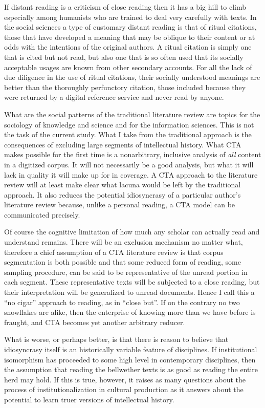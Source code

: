 \documentclass[]{book}
\theoremstyle{definition}
\theoremstyle{definition}
\theoremstyle{definition}
\theoremstyle{remark}
\begin{document}
If distant reading is a criticism of close reading then it has a big
hill to climb especially among humanists who are trained to deal very
carefully with texts. In the social sciences a type of customary distant
reading is that of ritual citations, those that have developed a meaning
that may be oblique to their content or at odds with the intentions of
the original authors. A ritual citation is simply one that is cited but
not read, but also one that is so often used that its socially
acceptable usages are known from other secondary accounts. For all the
lack of due diligence in the use of ritual citations, their socially
understood meanings are better than the thoroughly perfunctory citation,
those included because they were returned by a digital reference service
and never read by anyone.

What are the social patterns of the traditional literature review are
topics for the sociology of knowledge and science and for the
information sciences. This is not the task of the current study. What I
take from the traditional approach is the consequences of excluding
large segments of intellectual history. What CTA makes possible for the
first time is a nonarbitrary, inclusive analysis of \emph{all} content
in a digitized corpus. It will not necessarily be a good analysis, but
what it will lack in quality it will make up for in coverage. A CTA
approach to the literature review will at least make clear what lacuna
would be left by the traditional approach. It also reduces the potential
idiosyncrasy of a particular author's literature review because, unlike
a personal reading, a CTA model can be communicated precisely.

Of course the cognitive limitation of how much any scholar can actually
read and understand remains. There will be an exclusion mechanism no
matter what, therefore a chief assumption of a CTA literature review is
that corpus segmentation is both possible and that some reduced form of
reading, some sampling procedure, can be said to be representative of
the unread portion in each segment. These representative texts will be
subjected to a close reading, but their interpretation will be
generalized to unread documents. Hence I call this a ``no cigar''
approach to reading, as in ``close but''. If on the contrary no two
snowflakes are alike, then the enterprise of knowing more than we have
before is fraught, and CTA becomes yet another arbitrary reducer.

What is worse, or perhaps better, is that there is reason to believe
that idiosyncrasy itself is an historically variable feature of
disciplines. If institutional isomorphism has proceeded to some high
level in contemporary disciplines, then the assumption that reading the
bellwether texts is as good as reading the entire herd may hold. If this
is true, however, it raises as many questions about the process of
institutionalization in cultural production as it answers about the
potential to learn truer versions of intellectual history.
\end{document}
